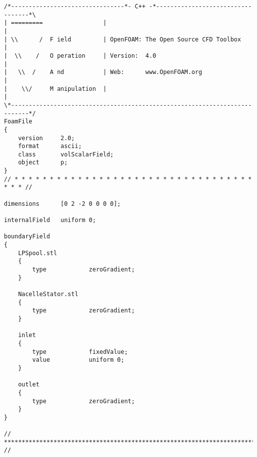 \begin{footnotesize}
\begin{verbatim}
/*--------------------------------*- C++ -*----------------------------------*\
| =========                 |                                                 |
| \\      /  F ield         | OpenFOAM: The Open Source CFD Toolbox           |
|  \\    /   O peration     | Version:  4.0                                   |
|   \\  /    A nd           | Web:      www.OpenFOAM.org                      |
|    \\/     M anipulation  |                                                 |
\*---------------------------------------------------------------------------*/
FoamFile
{
    version     2.0;
    format      ascii;
    class       volScalarField;
    object      p;
}
// * * * * * * * * * * * * * * * * * * * * * * * * * * * * * * * * * * * * * //

dimensions      [0 2 -2 0 0 0 0];

internalField   uniform 0;

boundaryField
{
    LPSpool.stl
    {
        type            zeroGradient;
    }

    NacelleStator.stl
    {
        type            zeroGradient;
    }

    inlet
    {
        type            fixedValue;
	    value		    uniform 0;
    }

    outlet
    {
        type            zeroGradient;
    }
}

// ************************************************************************* //

\end{verbatim}
\end{footnotesize}
